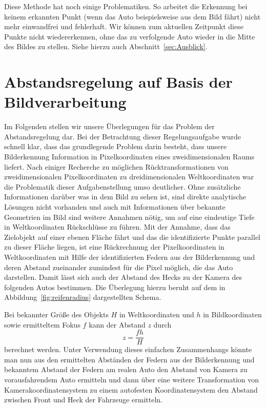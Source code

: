 \documentclass[10pt]{article}
\begin{document}
        Diese Methode hat noch einige Problematiken.
        So arbeitet die Erkennung bei keinem erkannten Punkt (wenn das Auto beispielsweise \glqq{}aus dem Bild fährt\grqq{}) nicht mehr einwandfrei und fehlerhaft.
        Wir können zum aktuellen Zeitpunkt diese Punkte nicht wiedererkennen, ohne das zu verfolgende Auto wieder in die Mitte des Bildes zu stellen. Siehe hierzu auch Abschnitt~\ref{sec:Ausblick}.



\section{Abstandsregelung auf Basis der Bildverarbeitung}\label{sec:Abstandsreglung}
    Im Folgenden stellen wir unsere Überlegungen für das Problem der Abstandsregelung dar.
    Bei der Betrachtung dieser Regelungsaufgabe wurde schnell klar, dass das grundlegende Problem darin besteht, dass unsere Bilderkennung Information in Pixelkoordinaten eines zweidimensionalen Raums liefert.
    Nach einiger Recherche zu möglichen Rücktransformationen von zweidimensionalen Pixelkoordinaten zu dreidimensionalen Weltkoordinaten war die Problematik dieser Aufgabenstellung umso deutlicher.
    Ohne zusätzliche Informationen darüber was in dem Bild zu sehen ist, sind direkte analytische Lösungen nicht vorhanden und auch mit Informationen über bekannte Geometrien im Bild sind weitere Annahmen nötig, um auf eine eindeutige Tiefe in Weltkoordinaten Rückschlüsse zu führen.
    Mit der Annahme, dass das Zielobjekt auf einer ebenen Fläche fährt und das die identifizierte Punkte parallel zu dieser Fläche liegen, ist eine Rückrechnung der Pixelkoordinaten in Weltkoordinaten mit Hilfe der identifizierten Federn aus der Bilderkennung und deren Abstand zueinander zumindest für die Pixel möglich, die das Auto darstellen.
    Damit lässt sich auch der Abstand des Hecks zu der Kamera des folgenden Autos bestimmen.
    Die Überlegung hierzu beruht auf dem in Abbildung~\ref{fig:reifenradius} dargestellten Schema.

    Bei bekannter Größe des Objekts $H$ in Weltkoordinaten und $h$ in Bildkoordinaten sowie ermitteltem Fokus $f$ kann der Abstand $z$ durch \[
    z = \frac{fh}{H}
    \] berechnet werden.
    Unter Verwendung dieses einfachen Zusammenhangs könnte man nun aus den ermittelten Abständen der Federn aus der Bilderkennung und bekanntem Abstand der Federn am realen Auto den Abstand von Kamera zu vorausfahrendem Auto ermitteln und dann über eine weitere Transformation von Kamerakoordinatensystem zu einem autofesten Koordinatensystem den Abstand zwischen Front und Heck der Fahrzeuge ermitteln.
\end{document}
